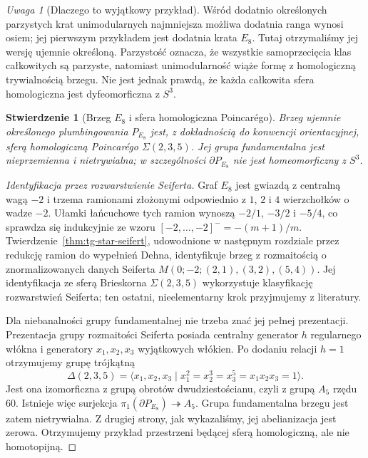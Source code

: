 \documentclass[11pt,a4paper]{report}
\numberwithin{equation}{section}
\theoremstyle{plain}
\newtheorem{stwierdzenie}[twierdzenie]{Stwierdzenie}
\theoremstyle{definition}
\theoremstyle{remark}
\newtheorem{uwaga}[twierdzenie]{Uwaga}
\begin{document}
\begin{uwaga}[Dlaczego to wyjątkowy przykład]
Wśród dodatnio określonych parzystych krat unimodularnych
najmniejsza możliwa dodatnia ranga wynosi osiem; jej
pierwszym przykładem jest dodatnia krata $E_8$.
Tutaj otrzymaliśmy jej wersję ujemnie określoną.
Parzystość oznacza, że wszystkie samoprzecięcia klas
całkowitych są parzyste, natomiast unimodularność
wiąże formę z homologiczną trywialnością brzegu.
Nie jest jednak prawdą, że każda całkowita sfera
homologiczna jest dyfeomorficzna z $S^3$.
\end{uwaga}

\begin{stwierdzenie}[Brzeg $E_8$ i sfera homologiczna Poincarégo]
Brzeg ujemnie określonego plumbingowania $P_{E_8}$
jest, z dokładnością do konwencji orientacyjnej,
\emph{sferą homologiczną Poincarégo}
$\Sigma(2,3,5)$. Jej grupa fundamentalna jest
nieprzemienna i nietrywialna; w szczególności
$\partial P_{E_8}$ nie jest homeomorficzny z $S^3$.
\end{stwierdzenie}

\begin{proof}[Identyfikacja przez rozwarstwienie Seiferta]
Graf $E_8$ jest gwiazdą z centralną wagą $-2$ i trzema
ramionami złożonymi odpowiednio z $1$, $2$ i $4$
wierzchołków o wadze $-2$. Ułamki łańcuchowe tych ramion
wynoszą $-2/1$, $-3/2$ i $-5/4$, co sprawdza się
indukcyjnie ze wzoru $[-2,\ldots,-2]^-=-(m+1)/m$.
Twierdzenie~\ref{thm:tg-star-seifert}, udowodnione w
następnym rozdziale przez redukcję ramion do wypełnień Dehna,
identyfikuje brzeg z rozmaitością o znormalizowanych danych
Seiferta $M(0;-2;(2,1),(3,2),(5,4))$.
Jej identyfikacja ze sferą Brieskorna $\Sigma(2,3,5)$
wykorzystuje klasyfikację rozwarstwień Seiferta; ten ostatni,
nieelementarny krok przyjmujemy z literatury.

Dla niebanalności grupy fundamentalnej nie trzeba
znać jej pełnej prezentacji. Prezentacja grupy rozmaitości
Seiferta posiada centralny generator $h$ regularnego
włókna i generatory $x_1,x_2,x_3$ wyjątkowych włókien.
Po dodaniu relacji $h=1$ otrzymujemy grupę trójkątną
\[
\Delta(2,3,5)=\langle x_1,x_2,x_3\mid
x_1^2=x_2^3=x_3^5=x_1x_2x_3=1\rangle.
\]
Jest ona izomorficzna z grupą obrotów dwudziestościanu,
czyli z grupą $A_5$ rzędu $60$. Istnieje więc
surjekcja $\pi_1(\partial P_{E_8})\twoheadrightarrow A_5$.
Grupa fundamentalna brzegu jest zatem nietrywialna.
Z drugiej strony, jak wykazaliśmy, jej abelianizacja
jest zerowa. Otrzymujemy przykład przestrzeni będącej
sferą homologiczną, ale nie homotopijną.
\end{proof}
\end{document}
